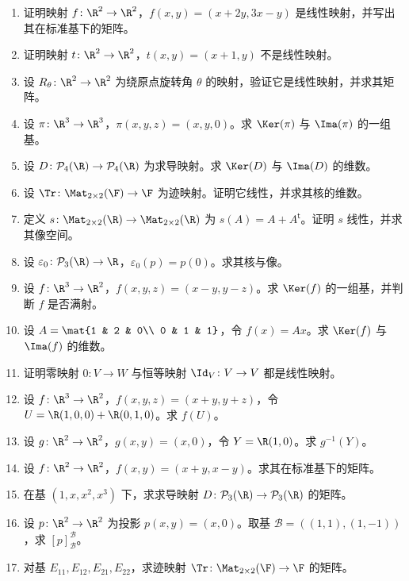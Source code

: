 \begin{enumerate}[label=\textbf{\arabic*.}, leftmargin=3.5em]
  \item {\basic} 证明映射 $f\colon \R^2\to\R^2$，$f(x,y)=(x+2y,3x-y)$ 是线性映射，并写出其在标准基下的矩阵。
  \item {\basic} 证明映射 $t\colon \R^2\to\R^2$，$t(x,y)=(x+1,y)$ 不是线性映射。
  \item {\basic} 设 $R_{\theta}\colon \R^2\to\R^2$ 为绕原点旋转角 $\theta$ 的映射，验证它是线性映射，并求其矩阵。
  \item {\basic} 设 $\pi\colon \R^3\to\R^3$，$\pi(x,y,z)=(x,y,0)$。求 $\Ker(\pi)$ 与 $\Ima(\pi)$ 的一组基。
  \item {\basic} 设 $D\colon \mathcal P_4(\R)\to\mathcal P_4(\R)$ 为求导映射。求 $\Ker(D)$ 与 $\Ima(D)$ 的维数。
  \item {\basic} 设 $\Tr\colon \Mat_{2\times 2}(\F)\to\F$ 为迹映射。证明它线性，并求其核的维数。
  \item {\basic} 定义 $s\colon \Mat_{2\times 2}(\R)\to\Mat_{2\times 2}(\R)$ 为 $s(A)=A+A^\mathsf{t}$。证明 $s$ 线性，并求其像空间。
  \item {\basic} 设 $\varepsilon_0\colon \mathcal P_3(\R)\to\R$，$\varepsilon_0(p)=p(0)$。求其核与像。
  \item {\basic} 设 $f\colon \R^3\to\R^2$，$f(x,y,z)=(x-y,y-z)$。求 $\Ker(f)$ 的一组基，并判断 $f$ 是否满射。
  \item {\basic} 设 $A=\mat{1 & 2 & 0\\ 0 & 1 & 1}$，令 $f(x)=Ax$。求 $\Ker(f)$ 与 $\Ima(f)$ 的维数。
  \item {\basic} 证明零映射 $0\colon V\to W$ 与恒等映射 $\Id_V\colon V\to V$ 都是线性映射。
  \item {\basic} 设 $f\colon \R^3\to\R^2$，$f(x,y,z)=(x+y,y+z)$，令 $U=\R(1,0,0)+\R(0,1,0)$。求 $f(U)$。
  \item {\basic} 设 $g\colon \R^2\to\R^2$，$g(x,y)=(x,0)$，令 $Y=\R(1,0)$。求 $g^{-1}(Y)$。
  \item {\basic} 设 $f\colon \R^2\to\R^2$，$f(x,y)=(x+y,x-y)$。求其在标准基下的矩阵。
  \item {\basic} 在基 $(1,x,x^2,x^3)$ 下，求求导映射 $D\colon \mathcal P_3(\R)\to\mathcal P_3(\R)$ 的矩阵。
  \item {\basic} 设 $p\colon \R^2\to\R^2$ 为投影 $p(x,y)=(x,0)$。取基 $\mathcal B=((1,1),(1,-1))$，求 $[p]_{\mathcal B}^{\mathcal B}$。
  \item {\basic} 对基 $E_{11},E_{12},E_{21},E_{22}$，求迹映射 $\Tr\colon \Mat_{2\times 2}(\F)\to\F$ 的矩阵。

\end{enumerate}
